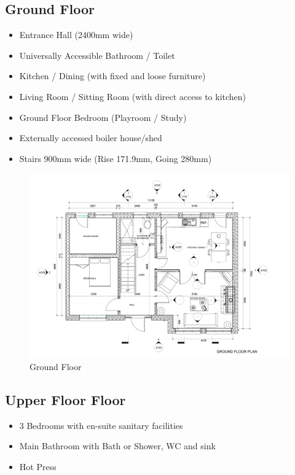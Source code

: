 \subsection*{Ground Floor}
\begin{itemize}
	\item Entrance Hall (2400mm wide)
	\item Universally Accessible Bathroom / Toilet
	\item Kitchen / Dining (with fixed and loose furniture)
	\item Living Room / Sitting Room (with direct access to kitchen)
	\item Ground Floor Bedroom (Playroom / Study)
	\item Externally accessed boiler house/shed
	\item Stairs 900mm wide (Rise 171.9mm, Going 280mm)
\end{itemize}



\begin{figure}
	\centering
	\includegraphics[width=1.0\linewidth]{./img/P01GroundFloorLevel.jpg}
	\caption{Ground Floor}
	\label{fig:p01groundfloorlevel}
\end{figure}


\newpage
\subsection*{Upper Floor Floor}
\begin{itemize}
	\item 3 Bedrooms with en-suite sanitary facilities
	\item Main Bathroom with Bath or Shower, WC and sink
	\item Hot Press
\end{itemize}



